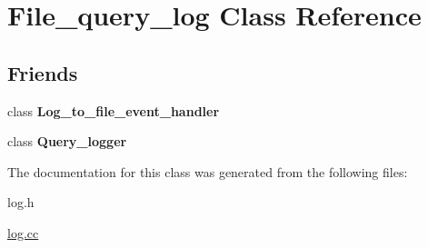 \hypertarget{classFile__query__log}{}\section{File\+\_\+query\+\_\+log Class Reference}
\label{classFile__query__log}
\subsection*{Friends}
\begin{DoxyCompactItemize}
\item 
\mbox{\label{classFile__query__log_adfa0afe91502e556a977f94e9d2778cf}} 
class {\bfseries Log\+\_\+to\+\_\+file\+\_\+event\+\_\+handler}
\item 
\mbox{\label{classFile__query__log_a29c57bd3a5d5e62664217e3cd1fb457d}} 
class {\bfseries Query\+\_\+logger}
\end{DoxyCompactItemize}


The documentation for this class was generated from the following files\+:\begin{DoxyCompactItemize}
\item 
log.\+h\item 
\mbox{\hyperlink{log_8cc}{log.\+cc}}\end{DoxyCompactItemize}
